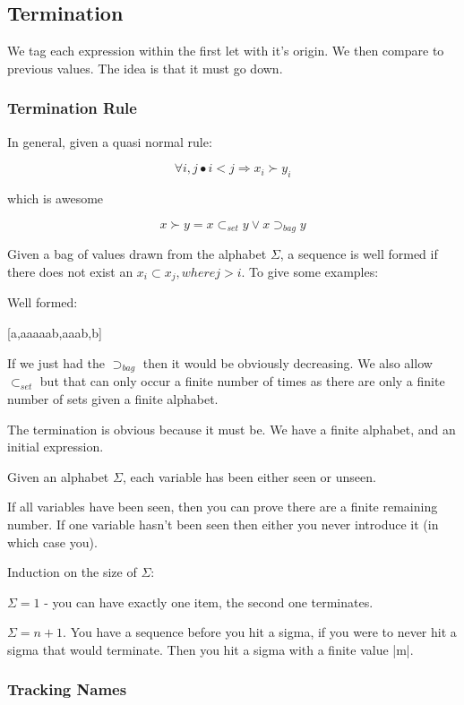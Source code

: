 \documentclass{sigplanconf}
\begin{document}
\subsection{Termination}
\label{sec:term}

We tag each expression within the first let with it's origin. We then compare to previous values. The idea is that it must go down.

\subsubsection{Termination Rule}

In general, given a quasi normal rule:

\[
\forall i, j \bullet i < j \Rightarrow x_i \succ y_i
\]

which is awesome

\[
x \succ y = x \subset_{set} y \vee x \supset_{bag} y
\]

Given a bag of values drawn from the alphabet $\Sigma$, a sequence is well formed if there does not exist an $x_i \subset x_j, where j > i$. To give some examples:

Well formed:

[a,aaaaab,aaab,b]

If we just had the $\supset_{bag}$ then it would be obviously decreasing. We also allow $\subset_{set}$ but that can only occur a finite number of times as there are only a finite number of sets given a finite alphabet.

The termination is obvious because it must be. We have a finite alphabet, and an initial expression.

Given an alphabet $\Sigma$, each variable has been either seen or unseen.

If all variables have been seen, then you can prove there are a finite remaining number. If one variable hasn't been seen then either you never introduce it (in which case you).

Induction on the size of $\Sigma$:

$\Sigma = 1$ - you can have exactly one item, the second one terminates.

$\Sigma = n+1$. You have a sequence before you hit a sigma, if you were to never hit a sigma that would terminate. Then you hit a sigma with a finite value |m|.

\subsubsection{Tracking Names}
\end{document}
